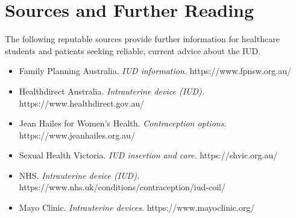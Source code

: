 \section*{Sources and Further Reading}
The following reputable sources provide further information for healthcare students and patients seeking reliable, current advice about the IUD.
\begin{itemize}
    \item Family Planning Australia. \textit{IUD information.} https://www.fpnsw.org.au/
    \item Healthdirect Australia. \textit{Intrauterine device (IUD).} https://www.healthdirect.gov.au/
    \item Jean Hailes for Women's Health. \textit{Contraception options.} https://www.jeanhailes.org.au/
    \item Sexual Health Victoria. \textit{IUD insertion and care.} https://shvic.org.au/
    \item NHS. \textit{Intrauterine device (IUD).} https://www.nhs.uk/conditions/contraception/iud-coil/
    \item Mayo Clinic. \textit{Intrauterine devices.} https://www.mayoclinic.org/
\end{itemize}
